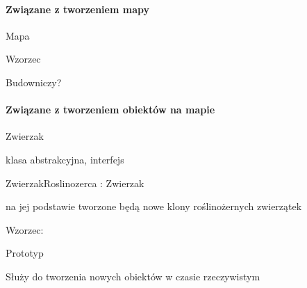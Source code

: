 \paragraph*{Związane z tworzeniem mapy}


\begin{DoxyItemize}
\item {\ttfamily Mapa}
\begin{DoxyItemize}
\item 
\end{DoxyItemize}
\item {\ttfamily Wzorzec}
\begin{DoxyItemize}
\item Budowniczy?
\end{DoxyItemize}
\end{DoxyItemize}

\paragraph*{Związane z tworzeniem obiektów na mapie}


\begin{DoxyItemize}
\item {\ttfamily Zwierzak}
\begin{DoxyItemize}
\item klasa abstrakcyjna, interfejs
\end{DoxyItemize}
\item {\ttfamily Zwierzak\-Roslinozerca \-: Zwierzak}
\begin{DoxyItemize}
\item na jej podstawie tworzone będą nowe klony roślinożernych zwierzątek
\end{DoxyItemize}
\item {\ttfamily Wzorzec\-:}
\begin{DoxyItemize}
\item Prototyp
\begin{DoxyItemize}
\item Służy do tworzenia nowych obiektów w czasie rzeczywistym 
\end{DoxyItemize}
\end{DoxyItemize}
\end{DoxyItemize}